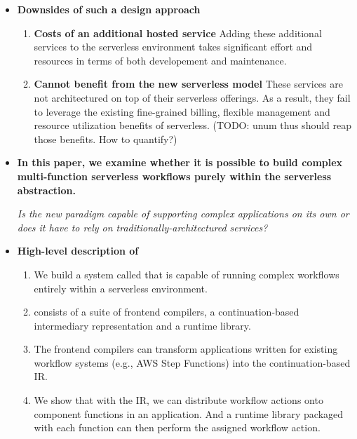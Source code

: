 \begin{itemize}
  \item \textbf{Downsides of such a design approach}

    \begin{enumerate}
      \item \textbf{Costs of an additional hosted service} Adding these
      additional services to the serverless environment takes significant
      effort and resources in terms of both developement and maintenance.

      \item \textbf{Cannot benefit from the new serverless model} These
      services are not architectured on top of their serverless offerings. As
      a result, they fail to leverage the existing fine-grained billing,
      flexible management and resource utilization benefits of serverless.
      (TODO: unum thus should reap those benefits. How to quantify?)
    \end{enumerate}


  \item \textbf{In this paper, we examine whether it is possible to build
  complex multi-function serverless workflows purely within the serverless
  abstraction.}

  \emph{Is the new paradigm capable of supporting complex applications on its
  own or does it have to rely on traditionally-architectured services?}

  \item \textbf{High-level description of \name{}}

    \begin{enumerate}

      \item We build a system called \name{} that is capable of running
      complex workflows entirely within a serverless environment.

      \item \name{} consists of a suite of frontend compilers, a
      continuation-based intermediary representation and a runtime library.

      \item The frontend compilers can transform applications written for
      existing workflow systems (e.g., AWS Step Functions) into the
      continuation-based
      \name{} IR.

      \item We show that with the IR, we can distribute workflow actions onto
      component functions in an application. And a runtime library packaged
      with each function can then perform the assigned workflow action.


\end{enumerate}
\end{itemize}
